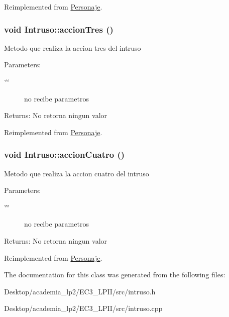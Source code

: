 Reimplemented from \hyperlink{classPersonaje_af7763eb6099390038b7833129a1ef9f}{Personaje}.\hypertarget{classIntruso_52e521cc66983d5a9f20f3424818e6e4}{
\subsubsection[accionTres]{\setlength{\rightskip}{0pt plus 5cm}void Intruso::accionTres ()}}
\label{classIntruso_52e521cc66983d5a9f20f3424818e6e4}


Metodo que realiza la accion tres del intruso \begin{Desc}
\item[Parameters:]
\begin{description}
\item[{\em \char`\"{}\char`\"{}}]no recibe parametros \end{description}
\end{Desc}
\begin{Desc}
\item[Returns:]No retorna ningun valor \end{Desc}


Reimplemented from \hyperlink{classPersonaje_85c25ff0362bf4f4f5e69965c1ae4cfb}{Personaje}.\hypertarget{classIntruso_99e215b1df4387b629f25349378d3bbb}{
\subsubsection[accionCuatro]{\setlength{\rightskip}{0pt plus 5cm}void Intruso::accionCuatro ()}}
\label{classIntruso_99e215b1df4387b629f25349378d3bbb}


Metodo que realiza la accion cuatro del intruso \begin{Desc}
\item[Parameters:]
\begin{description}
\item[{\em \char`\"{}\char`\"{}}]no recibe parametros \end{description}
\end{Desc}
\begin{Desc}
\item[Returns:]No retorna ningun valor \end{Desc}


Reimplemented from \hyperlink{classPersonaje_3aed5959a6a829819e0b0a6dcca9c2e4}{Personaje}.

The documentation for this class was generated from the following files:\begin{CompactItemize}
\item 
Desktop/academia\_\-lp2/EC3\_\-LPII/src/intruso.h\item 
Desktop/academia\_\-lp2/EC3\_\-LPII/src/intruso.cpp\end{CompactItemize}

